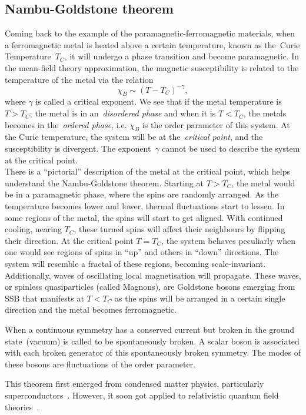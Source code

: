 \subsection{Nambu-Goldstone theorem}
Coming back to the example of the paramagnetic-ferromagnetic materials, when a ferromagnetic metal is heated above a certain temperature, known as the~{Curie Temperature}~$T_C$, it will undergo a phase transition and become paramagnetic. In the mean-field theory approximation, the magnetic susceptibility is related to the temperature of the metal via the relation
\begin{equation}
	\chi_B \sim (T-T_C)^{-\gamma},
\end{equation}  
where $\gamma$ is called a critical exponent. We see that if the metal temperature is $T>T_C$; the metal is in an~\textit{disordered phase} and when it is $T<T_C$, the metals becomes in the~\textit{ordered phase}, i.e. $\chi_B$ is the {order parameter} of this system. At the Curie temperature, the system will be at the~\textit{critical point}, and the susceptibility is divergent. The exponent~$\gamma$ cannot be used to describe the system at the critical point. \\ There is a ``pictorial'' description of the metal at the critical point, which helps understand the Nambu-Goldstone theorem. Starting at $T>T_C$, the metal would be in a paramagnetic phase, where the spins are randomly arranged. As the temperature becomes lower and lower, thermal fluctuations start to lessen. In some regions of the metal, the spins will start to get aligned. With continued cooling, nearing $T_C$, these turned spins will affect their neighbours by flipping their direction. At the critical point $T=T_C$, the system behaves peculiarly when one would see regions of spins in ``up'' and others in ``down'' directions. The system will resemble a fractal of these regions, becoming scale-invariant. Additionally, waves of oscillating local magnetisation will propagate. These waves, or spinless quasiparticles (called {Magnons}), are Goldstone bosons emerging from SSB that manifests at $T<T_C$ as the spins will be arranged in a certain single direction and the metal becomes ferromagnetic.
\begin{tcolorbox}[title=The Nambu-Goldstone theorem,
	title filled=false,
	colback=Mahogany!5!white,
	colframe=Mahogany]
	When a continuous symmetry has a conserved current but broken in the ground state~(vacuum) is called to be spontaneously broken. A scalar boson is associated with each broken generator of this spontaneously broken symmetry. The modes of these bosons are fluctuations of the order parameter.
\end{tcolorbox}
This theorem first emerged from condensed matter physics, particularly superconductors~\cite{PhysRev.117.648,goldstone}. However, it soon got applied to relativistic quantum field theories~\cite{PhysRev.127.965}.
